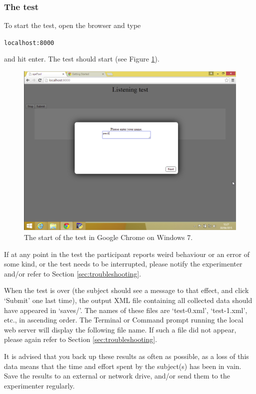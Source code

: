 \documentclass[11pt, oneside]{article}   	%
\begin{document}
		
		\subsubsection{The test}
			To start the test, open the browser and type 
			
			\texttt{localhost:8000}
			
			and hit enter. The test should start (see Figure \ref{fig:test}). 
			
			\begin{figure}[htb]
                        \begin{center}
                        \includegraphics[width=.8\textwidth]{test.png}
                        \caption{The start of the test in Google Chrome on Windows 7.}
                        \label{fig:test}
                        \end{center}
                        \end{figure}
                        
            If at any point in the test the participant reports weird behaviour or an error of some kind, or the test needs to be interrupted, please notify the experimenter and/or refer to Section \ref{sec:troubleshooting}. 
			
			When the test is over (the subject should see a message to that effect, and click `Submit' one last time), the output XML file containing all collected data should have appeared in `saves/'. The names of these files are `test-0.xml', `test-1.xml', etc., in ascending order. The Terminal or Command prompt running the local web server will display the following file name. If such a file did not appear, please again refer to Section \ref{sec:troubleshooting}. 
			
			It is advised that you back up these results as often as possible, as a loss of this data means that the time and effort spent by the subject(s) has been in vain. Save the results to an external or network drive, and/or send them to the experimenter regularly. 
			
\end{document}
